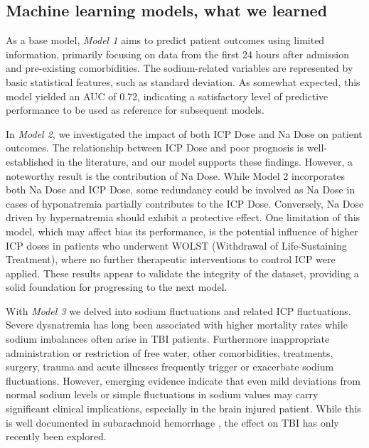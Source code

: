 \subsection{Machine learning models, what we learned}
As a base model, \textit{Model 1} aims to predict patient outcomes using limited information, primarily focusing on data from the first 24 hours after admission and pre-existing comorbidities. The sodium-related variables are represented by basic statistical features, such as standard deviation. As somewhat expected, this model yielded an AUC of 0.72, indicating a satisfactory level of predictive performance to be used as reference for subsequent models.

In \textit{Model 2}, we investigated the impact of both ICP Dose and Na Dose on patient outcomes. The relationship between ICP Dose and poor prognosis is well-established in the literature\cite{shethIntracranialPressureDose2013}\cite{schonenberg-tuPressureTimeDose2023}\cite{cuccioliniIntracranialPressureClinicians2023a}, and our model supports these findings. However, a noteworthy result is the contribution of Na Dose. While Model 2 incorporates both Na Dose and ICP Dose, some redundancy could be involved as Na Dose in cases of hyponatremia partially contributes to the ICP Dose. Conversely, Na Dose driven by hypernatremia should exhibit a protective effect. One limitation of this model, which may affect bias its performance, is the potential influence of higher ICP doses in patients who underwent WOLST (Withdrawal of Life-Sustaining Treatment), where no further therapeutic interventions to control ICP were applied.
These results appear to validate the integrity of the dataset, providing a solid foundation for progressing to the next model.

With \textit{Model 3} we delved into sodium fluctuations and related ICP fluctuations. 
Severe dysnatremia has long been associated with higher mortality rates while sodium imbalances often arise in TBI patients. Furthermore inappropriate administration or restriction of free water, other comorbidities, treatments, surgery\cite{marshallAssociationSodiumFluctuations2017}\cite{sakrFluctuationsSerumSodium2013}, trauma and acute illnesses\cite{senSodiumVariabilityAssociated2017a} frequently trigger or exacerbate sodium fluctuations. However, emerging evidence\cite{darmonPrognosticConsequencesBorderline2013} indicate that even mild deviations from normal sodium levels or simple fluctuations in sodium values may carry significant clinical implications, especially in the brain injured patient. While this is well documented in subarachnoid hemorrhage \cite{jinAssociationSerumSodium2022}\cite{labibSodiumItsImpact2024}\cite{balesEffectHyponatremiaSodium2016}\cite{topjianGreaterFluctuationsSerum2014}\cite{eaglesSignificanceFluctuationsSerum2019}\cite{haradaImpactHormonalDynamics2022}, the effect on TBI has only recently been explored\cite{harroisVariabilitySerumSodium2021a}. 

